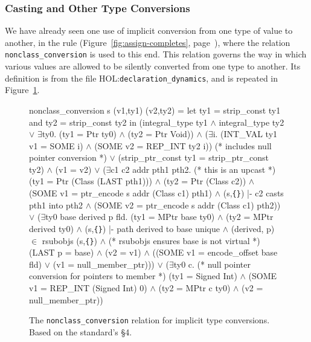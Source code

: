 \documentclass[11pt]{article}
\newcommand{\lbr}{\texttt{\{}}
\newcommand{\rbr}{\texttt{\}}}
\newcommand{\HOLfile}[1]{HOL:\texttt{#1}}
\begin{document}
\subsubsection{Casting and Other Type Conversions}
We have already seen one use of implicit conversion from one type of
value to another, in the rule 
(Figure~\ref{fig:assign-completes},
page~\pageref{fig:assign-completes}), where the relation
\texttt{nonclass_conversion} is used to this end.  This relation
governs the way in which various values are allowed to be silently
converted from one type to another.  Its definition is from the file
\HOLfile{declaration_dynamics}, and is repeated in
Figure~\ref{fig:nonclass-conversion}.
\begin{figure}
\begin{stdrule}
  nonclass_conversion s (v1,ty1) (v2,ty2) =
    let ty1 = strip_const ty1
    and ty2 = strip_const ty2
    in
      (integral_type ty1 \(\land\) integral_type ty2 \(\lor\)
       \(\exists\)ty0. (ty1 = Ptr ty0) \(\land\) (ty2 = Ptr Void)) \(\land\)
      (\(\exists\)i. (INT_VAL ty1 v1 = SOME i) \(\land\)
           (SOME v2 = REP_INT ty2 i))
              (* includes null pointer conversion *)
         \(\lor\)
      (strip_ptr_const ty1 = strip_ptr_const ty2) \(\land\) (v1 = v2)
         \(\lor\)
      (\(\exists\)c1 c2 addr pth1 pth2.  (* this is an upcast *)
          (ty1 = Ptr (Class (LAST pth1))) \(\land\)
          (ty2 = Ptr (Class c2)) \(\land\)
          (SOME v1 = ptr_encode s addr (Class c1) pth1) \(\land\)
          (s,\lbr\rbr) |- c2 casts pth1 into pth2 \(\land\)
          (SOME v2 = ptr_encode s addr (Class c1) pth2))
         \(\lor\)
      (\(\exists\)ty0 base derived p fld.
          (ty1 = MPtr base ty0) \(\land\) (ty2 = MPtr derived ty0) \(\land\)
          (s,\lbr\rbr) |- path derived to base unique \(\land\)
          (derived, p) \(\in\) rsubobjs (s,\lbr\rbr) \(\land\)
             (* rsubobjs ensures base is not virtual *)
          (LAST p = base) \(\land\)
          (v2 = v1) \(\land\)
          ((SOME v1 = encode_offset base fld) \(\lor\)
           (v1 = null_member_ptr)))
         \(\lor\)
      (\(\exists\)ty0 c.
          (* null pointer conversion for pointers to member *)
          (ty1 = Signed Int) \(\land\)
          (SOME v1 = REP_INT (Signed Int) 0) \(\land\)
          (ty2 = MPtr c ty0) \(\land\) (v2 = null_member_ptr))
\end{stdrule}
\caption[The \texttt{nonclass_conversion} Relation]{The
  \texttt{nonclass_conversion} relation for implicit type conversions.
  Based on the standard's \S4.}
\label{fig:nonclass-conversion}
\end{figure}
\end{document}
